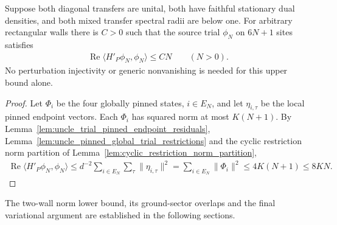\begin{lemma}
    \label{lem:uncle_trial_linear_energy}
    \leanok
    Suppose both diagonal transfers are unital, both have faithful
    stationary dual densities, and both mixed transfer spectral radii are
    below one. For arbitrary rectangular walls there is $C>0$ such that
    the source trial $\phi_N$ on $6N+1$ sites satisfies
    \begin{align}
        \operatorname{Re}\langle H'_P\phi_N,\phi_N\rangle\le CN
        \qquad (N>0).
    \end{align}
    No perturbation injectivity or generic nonvanishing is needed for
    this upper bound alone.
\end{lemma}
\begin{proof}
    \leanok
    Let $\Phi_i$ be the four globally pinned states, $i\in E_N$, and let
    $\eta_{i,\tau}$ be the local pinned endpoint vectors. Each $\Phi_i$ has
    squared norm at most $K(N+1)$. By
    Lemma~\ref{lem:uncle_trial_pinned_endpoint_residuals},
    Lemma~\ref{lem:uncle_pinned_global_trial_restrictions} and the cyclic
    restriction norm partition of
    Lemma~\ref{lem:cyclic_restriction_norm_partition},
    \begin{align}
        \operatorname{Re}\langle H'_P\phi_N,\phi_N\rangle
        \le d^{-2}\sum_{i\in E_N}\sum_\tau\|\eta_{i,\tau}\|^2
        =\sum_{i\in E_N}\|\Phi_i\|^2
        \le4K(N+1)\le8KN.
        \label{eq:uncle_trial_linear_energy_chain}
    \end{align}
\end{proof}

The two-wall norm lower bound, its ground-sector overlaps and the final
variational argument are established in the following sections.

